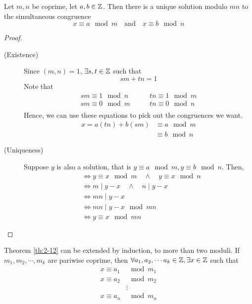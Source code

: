 \documentclass{article}
\begin{document}
\begin{nthm}\label{th:2-12}
    Let $m, n$ be coprime, let $a, b \in \mathbb{Z}$. Then there is a unique solution modulo $mn$ to the simultaneous congruence
    \[
        x \equiv a \mod m \quad \text{and} \quad x \equiv b \mod n  
    \]
\end{nthm}


\begin{proof}\leavevmode
    \begin{description}
        \item [(Existence)] Since $(m,n) = 1$, $\exists s, t \in \mathbb{Z}$ such that
        \[
            sm + tn = 1    
        \]
        Note that 
        \begin{align*}
            sm \equiv 1 \mod n \quad&\quad tn \equiv 1 \mod m\\
            sm \equiv 0 \mod m \quad&\quad tn \equiv 0 \mod n\\
        \end{align*}
        Hence, we can use these equations to pick out the congruences we want.
        \begin{align*}
            x = a(tn) + b(sm) &\equiv a \mod m \\
            &\equiv b \mod n  
        \end{align*}
        \item [(Uniqueness)] Suppose $y$ is also a solution, that is $y \equiv a \mod m, y \equiv b \mod n$. Then,
        \begin{align*}
            &\Leftrightarrow y \equiv x \mod m \quad\wedge\quad y \equiv x \mod n \\
            &\Leftrightarrow m \mid y - x \quad\wedge\quad n \mid y - x \\
            &\Leftrightarrow mn \mid y - x \tag{Since $(m,n) = 1$} \\
            &\Leftrightarrow mn \mid y - x \mod mn \\
            &\Leftrightarrow y \equiv x \mod mn 
        \end{align*}
    \end{description}
\end{proof}

\begin{remark}
    Theorem \ref{th:2-12} can be extended by induction, to more than two moduli. If $m_1, m_2, \cdots, m_k$ are pariwise coprime, then $\forall a_1, a_2, \cdots a_k \in \mathbb{Z}, \exists x \in \mathbb{Z}$ such that
    \begin{align*}
        x \equiv a_1 &\mod m_1 \\
        x \equiv a_2 &\mod m_2 \\ 
        &\vdots \\
        x \equiv a_n &\mod m_n
    \end{align*}
\end{remark}
\end{document}
